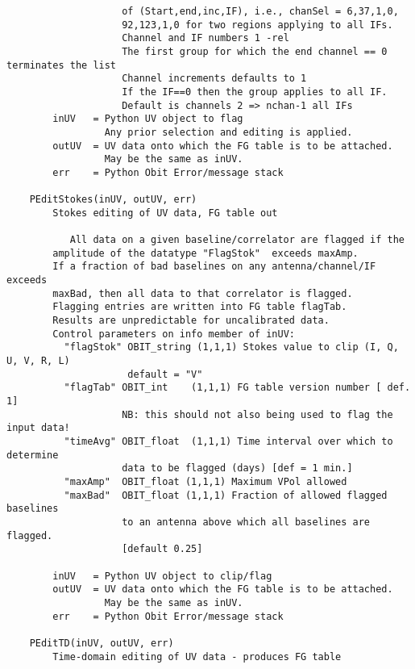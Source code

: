 \documentclass[11pt]{report}
\begin{document}
\begin{verbatim}
                    of (Start,end,inc,IF), i.e., chanSel = 6,37,1,0, 
                    92,123,1,0 for two regions applying to all IFs.  
                    Channel and IF numbers 1 -rel
                    The first group for which the end channel == 0 terminates the list
                    Channel increments defaults to 1
                    If the IF==0 then the group applies to all IF.
                    Default is channels 2 => nchan-1 all IFs
        inUV   = Python UV object to flag
                 Any prior selection and editing is applied.
        outUV  = UV data onto which the FG table is to be attached.
                 May be the same as inUV.
        err    = Python Obit Error/message stack
    
    PEditStokes(inUV, outUV, err)
        Stokes editing of UV data, FG table out
        
           All data on a given baseline/correlator are flagged if the 
        amplitude of the datatype "FlagStok"  exceeds maxAmp.  
        If a fraction of bad baselines on any antenna/channel/IF exceeds 
        maxBad, then all data to that correlator is flagged.  
        Flagging entries are written into FG table flagTab.
        Results are unpredictable for uncalibrated data.
        Control parameters on info member of inUV:
          "flagStok" OBIT_string (1,1,1) Stokes value to clip (I, Q, U, V, R, L)
                     default = "V"
          "flagTab" OBIT_int    (1,1,1) FG table version number [ def. 1]
                    NB: this should not also being used to flag the input data!
          "timeAvg" OBIT_float  (1,1,1) Time interval over which to determine
                    data to be flagged (days) [def = 1 min.]
          "maxAmp"  OBIT_float (1,1,1) Maximum VPol allowed
          "maxBad"  OBIT_float (1,1,1) Fraction of allowed flagged baselines 
                    to an antenna above which all baselines are flagged.
                    [default 0.25]
        
        inUV   = Python UV object to clip/flag
        outUV  = UV data onto which the FG table is to be attached.
                 May be the same as inUV.
        err    = Python Obit Error/message stack
    
    PEditTD(inUV, outUV, err)
        Time-domain editing of UV data - produces FG table
        

\end{verbatim}
\end{document}
